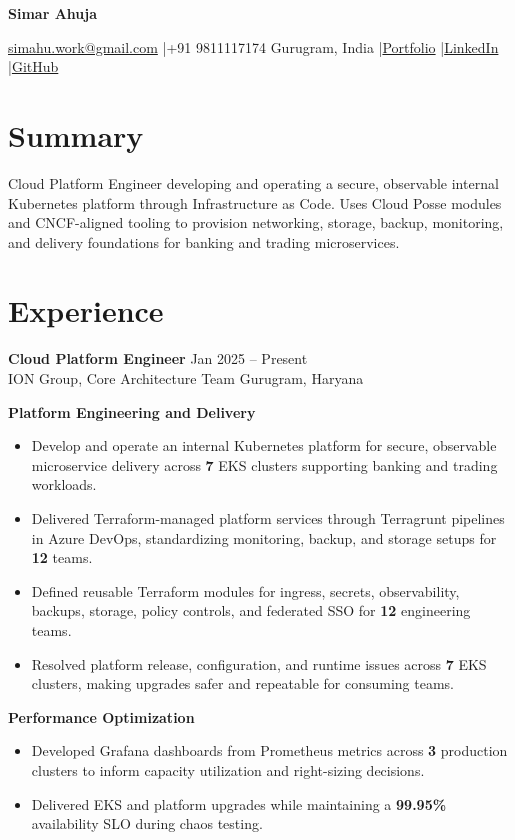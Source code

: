 \documentclass[letterpaper,10pt]{article}
\newcommand{\entry}[4]{%
  \noindent\textbf{#1} \hfill {\small #2}\\
  {\small #3} \hfill {\small #4}\par\vspace{2pt}%
}
\newcommand{\group}[1]{\vspace{3pt}\noindent\textbf{\small #1}\par\vspace{1pt}}
\begin{document}
\begin{center}
  {\LARGE \textbf{Simar Ahuja}}\\[3pt]
\end{center}
\vspace{-4pt}
\noindent
{\small \href{mailto:simahu.work@gmail.com}{simahu.work@gmail.com} \quad|\quad +91 9811117174}
\hfill
{\small Gurugram, India \quad|\quad \href{https://simxr.github.io/portfolio/}{Portfolio} \quad|\quad \href{https://www.linkedin.com/in/simarahuja/}{LinkedIn} \quad|\quad \href{https://github.com/simxr}{GitHub}}
\vspace{4pt}

\section{Summary}
{\small Cloud Platform Engineer developing and operating a secure, observable internal Kubernetes platform through Infrastructure as Code. Uses Cloud Posse modules and CNCF-aligned tooling to provision networking, storage, backup, monitoring, and delivery foundations for banking and trading microservices.}

\section{Experience}
\entry{Cloud Platform Engineer}{Jan 2025 -- Present}{ION Group, Core Architecture Team}{Gurugram, Haryana}
\small

\group{Platform Engineering and Delivery}
\begin{itemize}
  \item Develop and operate an internal Kubernetes platform for secure, observable microservice delivery across \textbf{7} EKS clusters supporting banking and trading workloads.
  \item Delivered Terraform-managed platform services through Terragrunt pipelines in Azure DevOps, standardizing monitoring, backup, and storage setups for \textbf{12} teams.
  \item Defined reusable Terraform modules for ingress, secrets, observability, backups, storage, policy controls, and federated SSO for \textbf{12} engineering teams.
  \item Resolved platform release, configuration, and runtime issues across \textbf{7} EKS clusters, making upgrades safer and repeatable for consuming teams.
\end{itemize}

\group{Performance Optimization}
\begin{itemize}
  \item Developed Grafana dashboards from Prometheus metrics across \textbf{3} production clusters to inform capacity utilization and right-sizing decisions.
  \item Delivered EKS and platform upgrades while maintaining a \textbf{99.95\%} availability SLO during chaos testing.
\end{itemize}
\end{document}
